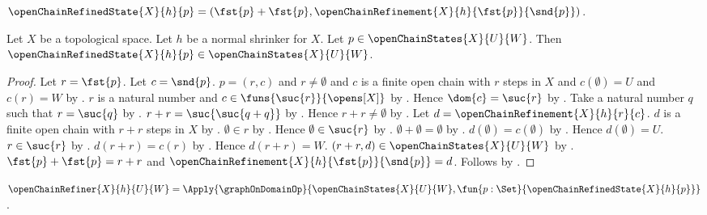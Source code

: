\begin{definition}\label{open_chain_refined_state}
    $\openChainRefinedState{X}{h}{p}=
        (\fst{p}+\fst{p},
            \openChainRefinement{X}{h}{\fst{p}}{\snd{p}})$.
\end{definition}

\begin{theorem}\label{open_chain_refined_state_in}
    Let $X$ be a topological space.
    Let $h$ be a normal shrinker for $X$.
    Let $p\in\openChainStates{X}{U}{W}$.
    Then $\openChainRefinedState{X}{h}{p}
        \in\openChainStates{X}{U}{W}$.
\end{theorem}
\begin{proof}
    Let $r=\fst{p}$.
    Let $c=\snd{p}$.
    $p=(r,c)$ and $r\neq\emptyset$ and
        $c$ is a finite open chain with $r$ steps in $X$ and
        $c(\emptyset)=U$ and $c(r)=W$
        by .
    $r$ is a natural number and
        $c\in\funs{\suc{r}}{\opens[X]}$
        by .
    Hence $\dom{c}=\suc{r}$ by .
    Take a natural number $q$ such that $r=\suc{q}$
        by .
    $r+r=\suc{\suc{q+q}}$
        by .
    Hence $r+r\neq\emptyset$ by .
    Let $d=\openChainRefinement{X}{h}{r}{c}$.
    $d$ is a finite open chain with $r+r$ steps in $X$
        by .
    $\emptyset\in r$ by .
    Hence $\emptyset\in\suc{r}$ by .
    $\emptyset+\emptyset=\emptyset$
        by .
    $d(\emptyset)=c(\emptyset)$
        by .
    Hence $d(\emptyset)=U$.
    $r\in\suc{r}$ by .
    $d(r+r)=c(r)$ by .
    Hence $d(r+r)=W$.
    $(r+r,d)\in\openChainStates{X}{U}{W}$
        by .
    $\fst{p}+\fst{p}=r+r$ and
        $\openChainRefinement{X}{h}{\fst{p}}{\snd{p}}=d$.
    Follows by .
\end{proof}

\begin{definition}\label{open_chain_refiner}
    $\openChainRefiner{X}{h}{U}{W}=
        \Apply{\graphOnDomainOp}
            {\openChainStates{X}{U}{W},
                \fun{p:\Set}{\openChainRefinedState{X}{h}{p}}}$.
\end{definition}

